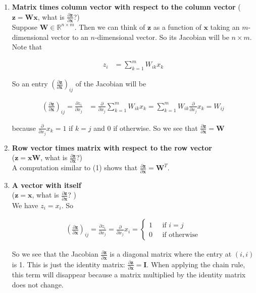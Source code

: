 \documentclass{article}[11pt]
\newcommand{\bW} { \bm{W} }
\newcommand{\bz} { \bm{z} }
\newcommand{\bx} { \bm{x} }
\newcommand{\bI} { \bm{I} }
\newcommand{\alns}[1] {
	\begin{align*} #1 \end{align*}
}
\newcommand{\pd}[2] {
 \frac{\partial #1}{\partial #2}
}
\begin{document}
\begin{enumerate}[(1)]


\item \textbf{Matrix times column vector with respect to the column vector} ($\bz = \bW \bx$, what is $\pd{\bz}{\bx}$?) \\

Suppose $\bW \in \mathbb{R}^{n \times m}$. Then we can think of $\bz$ as a function of $\bx$ taking an $m$-dimensional vector to an $n$-dimensional vector. So its Jacobian will be $n \times m$. Note that
\alns{
	z_i &= \sum_{k=1}^m  W_{ik} x_{k}
}
So an entry $(\pd{\bz}{\bx})_{ij}$ of the Jacobian will be
\alns{
	(\pd{\bz}{\bx})_{ij} = \pd{z_i}{x_j} &=  \pd{}{x_j}\sum_{k=1}^m  W_{ik} x_{k} = \sum_{k=1}^m  W_{ik} \pd{}{x_j}x_{k} = W_{ij}
}
because $\pd{}{x_j}x_{k} = 1$ if $k = j$ and 0 if otherwise. So we see that $\boxed{\pd{\bz}{\bx} = \bW}$


\item \textbf{Row vector times matrix with respect to the row vector} \\ ($\bz =  \bx \bW$, what is $\pd{\bz}{\bx}$?) \\

A computation similar to (1) shows that $\boxed{\pd{\bz}{\bx} = \bW^T}$.

\item \textbf{A vector with itself}\\($\bz = \bx$, what is $\pd{\bz}{\bx}$? ) \\
We have $z_i = x_i$. So
\alns{
(\pd{\bz}{\bx})_{ij} = \pd{z_i}{x_j} = \pd{}{x_j}x_i = \begin{cases}
	1 \phantom{abc} \text{if $i = j$} \\
	0 \phantom{abc} \text{if otherwise} 
	\end{cases}
}
So we see that the Jacobian $\pd{\bz}{\bx}$ is a diagonal matrix where the entry at $(i, i)$ is 1. This is just the identity matrix: $\boxed{\pd{\bz}{\bx} = \bI}$. When applying the chain rule, this term will disappear because a matrix multiplied by the identity matrix does not change.


\end{enumerate}
\end{document}
